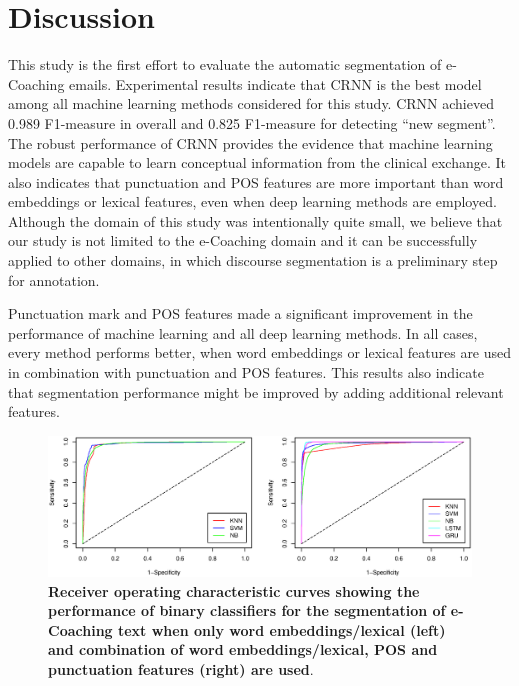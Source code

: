 \documentclass{amia}
\begin{document}
\section*{Discussion}
This study is the first effort to evaluate the automatic segmentation of e-Coaching emails. Experimental results indicate that CRNN is the best model among all machine learning methods considered for this study. CRNN achieved 0.989 F1-measure in overall and 0.825 F1-measure for detecting ``new segment''. The robust performance of CRNN provides the evidence that machine learning models are capable to learn conceptual information from the clinical exchange. It also indicates that punctuation and POS features are more important than word embeddings or lexical features, even when deep learning methods are employed. Although the domain of this study was intentionally quite small, we believe that our study is not limited to the e-Coaching domain and it can be successfully applied to other domains, in which discourse segmentation is a preliminary step for annotation.

Punctuation mark and POS features made a significant improvement in the performance of machine learning and all deep learning methods. In all cases, every method performs better, when word embeddings or lexical features are used in combination with punctuation and POS features. This results also indicate that segmentation performance might be improved by adding additional relevant features. \\     

\begin{figure}[!htb]
    \centering
    \includegraphics[width=1.0\textwidth]{figures/roc-curves.eps}
    \caption{\textbf{Receiver operating characteristic curves showing the performance of binary classifiers for the segmentation of e-Coaching text when only word embeddings/lexical (left) and combination of word embeddings/lexical, POS and punctuation features (right) are used}.}
    \label{fig:roc-curves}
\end{figure}
\end{document}
